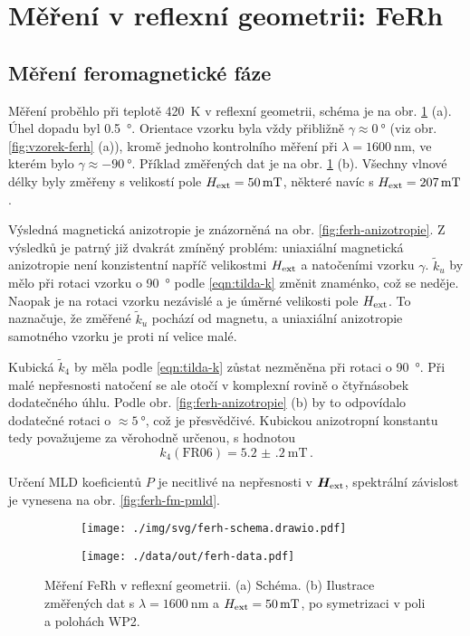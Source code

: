 \section{Měření v reflexní geometrii: FeRh}
\label{chap:vysledky-ferh}

\subsection{Měření feromagnetické fáze}
\label{chap:ferh-fm}

Měření proběhlo při teplotě \SI{420}{\kelvin} v reflexní geometrii, schéma je na obr. \ref{fig:ferh-fm-schema-data} (a).
Úhel dopadu byl \SI{0.5}{\degree}.
Orientace vzorku byla vždy přibližně $\gamma\approx\SI{0}{\degree}$ (viz obr. \ref{fig:vzorek-ferh} (a)), kromě jednoho kontrolního měření při $\lambda=\SI{1600}{\nano\meter}$, ve kterém bylo $\gamma\approx\SI{-90}{\degree}$.
Příklad změřených dat je na obr. \ref{fig:ferh-fm-schema-data} (b).
Všechny vlnové délky byly změřeny s velikostí pole $H_\textrm{ext}=\SI{50}{\milli\tesla}$, některé navíc s $H_\textrm{ext}=\SI{207}{\milli\tesla}$.

Výsledná magnetická anizotropie je znázorněná na obr. \ref{fig:ferh-anizotropie}.
Z výsledků je patrný již dvakrát zmíněný problém: uniaxiální magnetická anizotropie není konzistentní napříč velikostmi $H_\textrm{ext}$ a natočeními vzorku $\gamma$.
$\tilde{k}_u$ by mělo při rotaci vzorku o \SI{90}{\degree} podle \eqref{eqn:tilda-k} změnit znaménko, což se neděje.
Naopak je na rotaci vzorku nezávislé a je úměrné velikosti pole $H_\textrm{ext}$.
To naznačuje, že změřené $\tilde{k}_u$ pochází od magnetu, a uniaxiální anizotropie samotného vzorku je proti ní velice malé.

Kubická $\tilde{k}_4$ by měla podle \eqref{eqn:tilda-k} zůstat nezměněna při rotaci o \SI{90}{\degree}.
Při malé nepřesnosti natočení se ale otočí v komplexní rovině o čtyřnásobek dodatečného úhlu.
Podle obr. \ref{fig:ferh-anizotropie} (b) by to odpovídalo dodatečné rotaci o $\approx \SI{5}{\degree}$, což je přesvědčivé.
Kubickou anizotropní konstantu tedy považujeme za věrohodně určenou, s hodnotou
\begin{equation}
    k_4 (\textrm{FR06}) = \SI{5.2(2)}{\milli\tesla} \,.
\end{equation}

Určení MLD koeficientů $P$ je necitlivé na nepřesnosti v $\bm{H}_\textrm{ext}$, spektrální závislost je vynesena na obr. \ref{fig:ferh-fm-pmld}.

\begin{figure}[htbp]
    \centering
    \begin{subfigure}{.3\textwidth}
        \centering
        \texttt{[image: ./img/svg/ferh-schema.drawio.pdf]}
    \end{subfigure}
    \begin{subfigure}{.65\textwidth}
        \texttt{[image: ./data/out/ferh-data.pdf]}
    \end{subfigure}
    \caption{Měření FeRh v reflexní geometrii. (a) Schéma. (b) Ilustrace změřených dat s $\lambda=\SI{1600}{\nano\meter}$ a $H_\textrm{ext}=\SI{50}{\milli\tesla}$, po symetrizaci v poli a polohách WP2.}
    \label{fig:ferh-fm-schema-data}
\end{figure}

